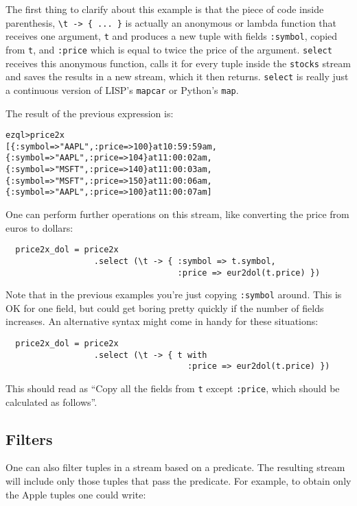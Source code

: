 \documentclass{report}
\newenvironment{evaluation}
{
  \framed
  \begin{alltt}
}
{
  \end{alltt}
  \endframed
}
\begin{document}
The first thing to clarify about this example is that the piece of
code inside parenthesis, \verb!\t -> { ... }! is actually an anonymous
or lambda function that receives one argument, \verb=t= and produces a
new tuple with fields \verb=:symbol=, copied from \verb=t=, and
\verb=:price= which is equal to twice the price of the
argument. \verb=select= receives this anonymous function, calls it for
every tuple inside the \verb=stocks= stream and saves the results in a
new stream, which it then returns. \verb=select= is really just a
continuous version of LISP's \verb=mapcar= or Python's \verb=map=.

The result of the previous expression is:

\begin{evaluation}
  ezql> price2x
  [\{ :symbol => "AAPL", :price => 100 \} at 10:59:59 am,
   \{ :symbol => "AAPL", :price => 104 \} at 11:00:02 am,
   \{ :symbol => "MSFT", :price => 140 \} at 11:00:03 am,
   \{ :symbol => "MSFT", :price => 150 \} at 11:00:06 am,
   \{ :symbol => "AAPL", :price => 100 \} at 11:00:07 am]
\end{evaluation}

One can perform further operations on this stream, like
converting the price from euros to dollars:

\begin{verbatim}
  price2x_dol = price2x
                  .select (\t -> { :symbol => t.symbol,
                                   :price => eur2dol(t.price) })
\end{verbatim}

Note that in the previous examples you're just copying \verb=:symbol=
around. This is OK for one field, but could get boring pretty quickly
if the number of fields increases. An alternative syntax might come in
handy for these situations:

\begin{verbatim}
  price2x_dol = price2x
                  .select (\t -> { t with
                                     :price => eur2dol(t.price) })
\end{verbatim}

This should read as ``Copy all the fields from \verb=t= except
\verb=:price=, which should be calculated as follows''.

\subsection{Filters}
\label{sec:filters}

One can also filter tuples in a stream based on a predicate. The
resulting stream will include only those tuples that pass the
predicate. For example, to obtain only the Apple tuples one could
write:
\end{document}

